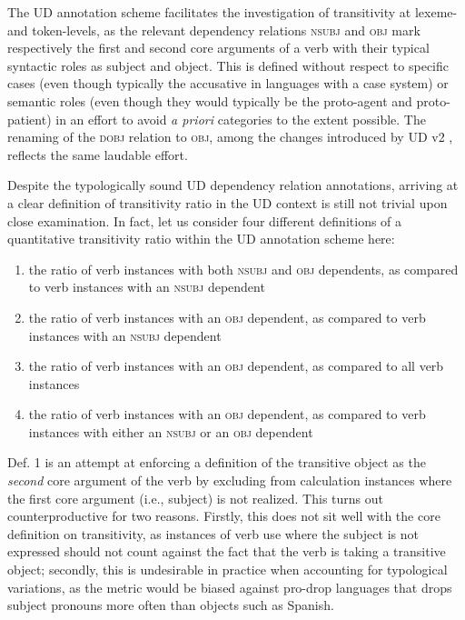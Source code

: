 The UD annotation scheme facilitates the investigation of transitivity at lexeme- and token-levels, as the relevant dependency relations \textsc{nsubj} and \textsc{obj} mark respectively the first and second core arguments of a verb with their typical syntactic roles as subject and object. This is defined without respect to specific cases (even though typically the accusative in languages with a case system) or semantic roles (even though they would typically be the proto-agent and proto-patient) in an effort to avoid \textit{a priori} categories to the extent possible. The renaming of the \textsc{dobj} relation to \textsc{obj}, among the changes introduced by UD v2 \citep{nivre2020}, reflects the same laudable effort.

Despite the typologically sound UD dependency relation annotations, arriving at a clear definition of transitivity ratio in the UD context is still not trivial upon close examination. In fact, let us consider four different definitions of a quantitative transitivity ratio within the UD annotation scheme here:

\begin{enumerate}
    \item the ratio of verb instances with both \textsc{nsubj} and \textsc{obj} dependents, as compared to verb instances with an \textsc{nsubj} dependent
    \item the ratio of verb instances with an \textsc{obj} dependent, as compared to verb instances with an \textsc{nsubj} dependent
    \item the ratio of verb instances with an \textsc{obj} dependent, as compared to all verb instances
    \item the ratio of verb instances with an \textsc{obj} dependent, as compared to verb instances with either an \textsc{nsubj} or an \textsc{obj} dependent
\end{enumerate}

Def. 1 is an attempt at enforcing a definition of the transitive object as the \textit{second} core argument of the verb by excluding from calculation instances where the first core argument (i.e., subject) is not realized. This turns out counterproductive for two reasons. Firstly, this does not sit well with the core definition on transitivity, as instances of verb use where the subject is not expressed should not count against the fact that the verb is taking a transitive object; secondly, this is undesirable in practice when accounting for typological variations, as the metric would be biased against pro-drop languages that drops subject pronouns more often than objects such as Spanish.

